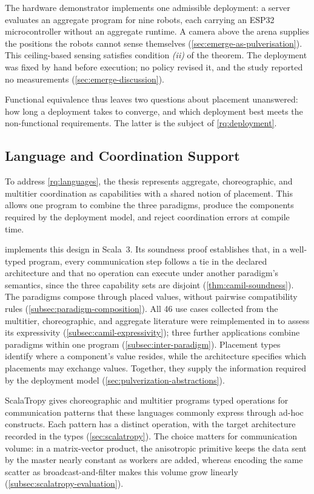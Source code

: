 The hardware demonstrator implements one admissible deployment:
a server evaluates an aggregate program for nine robots,
each carrying an ESP32 microcontroller without an aggregate runtime.
A camera above the arena supplies the positions the robots cannot sense themselves (\cref{sec:emerge-as-pulverisation}).
This ceiling-based sensing satisfies condition \emph{(ii)} of the theorem.
The deployment was fixed by hand before execution;
no policy revised it, and the study reported no measurements (\cref{sec:emerge-discussion}).

Functional equivalence thus leaves two questions about placement unanswered:
how long a deployment takes to converge, and which deployment best meets the non-functional requirements.
The latter is the subject of \cref{rq:deployment}.

\subsection{Language and Coordination Support}
\label{subsec:answer-languages}

To address \cref{rq:languages}, the thesis represents aggregate, choreographic, and multitier coordination
as capabilities with a shared notion of placement.
This allows one program to combine the three paradigms,
produce the components required by the deployment model,
and reject coordination errors at compile time.

\camil implements this design in Scala~3.
Its soundness proof establishes that, in a well-typed program, every communication step follows a tie in the declared architecture
and that no operation can execute under another paradigm's semantics,
since the three capability sets are disjoint (\cref{thm:camil-soundness}).
The paradigms compose through placed values, without pairwise compatibility rules (\cref{subsec:paradigm-composition}).
All 46 use cases collected from the multitier, choreographic, and aggregate literature
were reimplemented in \camil to assess its expressivity (\cref{subsec:camil-expressivity});
three further applications combine paradigms within one program (\cref{subsec:inter-paradigm}).
Placement types identify where a component's value resides,
while the architecture specifies which placements may exchange values.
Together, they supply the information required by the deployment model (\cref{sec:pulverization-abstractions}).

ScalaTropy gives choreographic and multitier programs typed operations for communication patterns
that these languages commonly express through ad-hoc constructs.
Each pattern has a distinct operation, with the target architecture recorded in the types (\cref{sec:scalatropy}).
The choice matters for communication volume:
in a matrix-vector product, the anisotropic primitive keeps the data sent by the master nearly constant as workers are added,
whereas encoding the same scatter as broadcast-and-filter makes this volume grow linearly (\cref{subsec:scalatropy-evaluation}).

